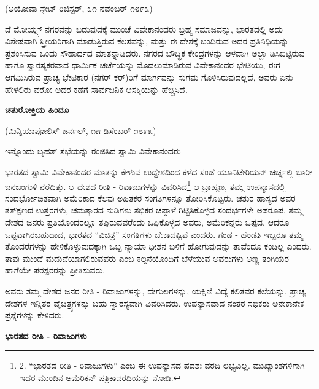 \begin{center}
(ಅಯೋವಾ ಸ್ಟೇಟ್ ರಿಜಿಸ್ಟರ್, ೩೧ ನವೆಂಬರ್ ೧೮೯೩)
\end{center}

ದೆ ಮೋಯ್ನ್ಸ್ ನಗರವನ್ನು ಬಿಡುವುದಕ್ಕೆ ಮುಂಚೆ ವಿವೇಕಾನಂದರು ಬ್ರಹ್ಮ ಸಮಾಜವನ್ನು, ಭಾರತದಲ್ಲಿ ಅದು ವಿಶೇಷವಾಗಿ ಸ್ತ್ರೀಯರಿಗಾಗಿ ಮಾಡುತ್ತಿರುವ ಕೆಲಸವನ್ನು, ಮತ್ತು ಈ ದೇಶಕ್ಕೆ ಬಂದಿರುವ ಅದರ ಪ್ರತಿನಿಧಿಯನ್ನು ಪ್ರಶಂಸಿಸುವ ಒಂದು ಸೌಹಾರ್ದದ ಮಾತನ್ನಾಡಿದರು. ನಗರದ ಬೌದ್ಧಿಕ ಕೇಂದ್ರಗಳನ್ನು ಆಳವಾಗಿ ಅಲ್ಲಾ ಡಿಸಿಬಿಟ್ಟಿರುವ ಹಾಗೂ ಸ್ವಾರಸ್ಯಕರವಾದ ಧಾರ್ಮಿಕ ಚರ್ಚೆಯನ್ನು ಮೊದಲುಮಾಡಿರುವ ವಿವೇಕಾನಂದರ ಭೇಟಿಯು, ಈಗ ಆಗಮಿಸಿರುವ ಪ್ರಾಚ್ಯ ಭೇಟಿಕಾರ (ನಗರ್ ಕರ್)ರಿಗೆ ಮಾರ್ಗವನ್ನು ಸುಗಮ ಗೊಳಿಸಿರುವುದಲ್ಲದೆ, ಅವರು ಏನು ಹೇಳಲಿರು ವರೋ ಅದರ ಕಡೆಗೆ ಸಾರ್ವಜನಿಕ ಆಸಕ್ತಿಯನ್ನು ಹೆಚ್ಚಿಸಿದೆ.

\begin{center}
\textbf{ಚತುರೋಕ್ತಿಯ ಹಿಂದೂ}
\end{center}

\begin{center}
(ಮಿನ್ನಿಯಾಪೋಲಿಸ್ ಜರ್ನಲ್, ೧೫ ಡಿಸೆಂಬರ್ ೧೮೯೩)
\end{center}

\begin{center}
ಇನ್ನೊಂದು ಬೃಹತ್ ಸಭೆಯನ್ನು ರಂಜಿಸಿದ ಸ್ವಾಮಿ ವಿವೇಕಾನಂದರು
\end{center}

ಭಾರತದ ಸ್ವಾಮಿ ವಿವೇಕಾನಂದರ ಮಾತನ್ನು ಕೇಳುವ ಉದ್ದೇಶದಿಂದ ಕಳೆದ ಸಂಜೆ ಯೂನಿಟೇರಿಯನ್ ಚರ್ಚ್ನಲ್ಲಿ ಭಾರೀ ಜನಜಂಗುಳಿ ನೆರೆದಿತ್ತು. ಆ ದೇಶದ ರೀತಿ - ರಿವಾಜುಗಳನ್ನು ವಿವರಿಸಿದ\footnote{2. “ಭಾರತದ ರೀತಿ - ರಿವಾಜುಗಳು” ಎಂಬ ಈ ಉಪನ್ಯಾಸದ ಪದಶಃ ವರದಿ ಲಭ್ಯವಿಲ್ಲ. ಮುಖ್ಯಾಂಶಗಳಿಗಾಗಿ ಇದರ ಮುಂದಿನ ಅಮೆರಿಕನ್ ಪತ್ರಿಕಾವರದಿಯನ್ನು ನೋಡಿ.} ಆ ಬ್ರಾಹ್ಮಣ, ತಮ್ಮ ಉಪನ್ಯಾಸದಲ್ಲಿ ಸಂದರ್ಭೋಚಿತವಾಗಿ ಅಮೆರಿಕಾದ ಕೆಲವು ಅಹಿತಕರ ಸಂಗತಿಗಳನ್ನೂ ತೋರಿಸಿಕೊಟ್ಟರು. ಚತುರ ಹಾಸ್ಯದ ಅವರ ತತ್ಕ್ಷಣದ ಉತ್ತರಗಳು, ಚಮತ್ಕಾರದ ನುಡಿಗಳು ಸಭಿಕರ ಚಪ್ಪಾಳೆ ಗಿಟ್ಟಿಸಿಕೊಳ್ಳದ ಸಂದರ್ಭಗಳೇ ಅಪರೂಪ. ತಮ್ಮ ದೇಶದ ಜನರು ಪ್ರತಿಯೊಂದರಲ್ಲೂ ತಪ್ಪಿರುವವರೆಂದು ಒಪ್ಪಿಕೊಳ್ಳದ ಅವರು, ಅಮೆರಿಕನ್ನರು ಒಪ್ಪದ, ಆದರೂ ಒಪ್ಪವಾಗಿರಬಹುದಾದ, ಭಾರತದ “ವಿಚಿತ್ರ” ಸಂಗತಿಗಳು ಬೇಕಾದಷ್ಟಿವೆ ಎಂದರು. ಗಂಡ - ಹೆಂಡತಿ ಇಬ್ಬರೂ ತಮ್ಮ ತೊಂದರೆಗಳನ್ನು ಹೇಳಿಕೊಳ್ಳುವುದಕ್ಕಾಗಿ ಒಬ್ಬ ನ್ಯಾಯಾ ಧೀಶನ ಬಳಿಗೆ ಹೋಗುವುದನ್ನು ತಾವೆಂದೂ ಕಂಡಿಲ್ಲ ಎಂದರು. ತಾವು ಮುಂದೆ ಮದುವೆಯಾಗಲಿರುವವರು ಎಂಬ ಕಲ್ಪನೆಯೊಂದಿಗೆ ಬೆಳೆಯುವ ಅವರುಗಳು ಅಣ್ಣ ತಂಗಿಯರ ಹಾಗೆಯೇ ಪರಸ್ಪರರನ್ನು ಪ್ರೀತಿಸುವರು.

ಅವರು ತಮ್ಮ ದೇಶದ ಜನರ ರೀತಿ - ರಿವಾಜುಗಳನ್ನು, ದೇಗುಲಗಳನ್ನು, ಯಕ್ಷಿಣಿ ವಿದ್ಯೆ ಕಲಿತವರ ಕಲೆಯನ್ನು, ಪ್ರಾಚ್ಯ ದೇಶಗಳ ಇನ್ನಿತರ ವೈಚಿತ್ರ್ಯಗಳನ್ನು ಬಹು ಸ್ವಾರಸ್ಯವಾಗಿ ವಿವರಿಸಿದರು. ಉಪನ್ಯಾಸವಾದ ನಂತರ ಸಭಿಕರು ಅನೇಕಾನೇಕ ಪ್ರಶ್ನೆಗಳನ್ನು ಕೇಳಿದರು.

\begin{center}
\textbf{ಭಾರತದ ರೀತಿ - ರಿವಾಜುಗಳು}
\end{center}

